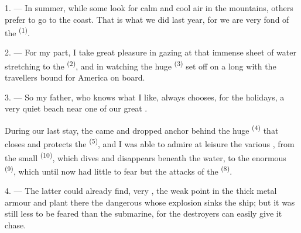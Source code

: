 %

\VUsaut{4.0mm}
\VUsaut{3.0mm}
\VUsaut{3.0mm}

1. --- In summer, while some look for calm and cool air in the mountains,
others prefer to go to the coast. That is what we did last year, for we
are very fond of the  \textsuperscript{(1)}.

2. --- For my part, I take great pleasure in gazing at that immense sheet
of water stretching to the  \textsuperscript{(2)}, and in watching
the huge  \textsuperscript{(3)} set off on a long
 with the travellers bound for America on board.

3. --- So my father, who knows what I like, always chooses, for the
holidays, a very quiet beach near one of our great .

During our last stay, the  came and dropped anchor behind
the huge  \textsuperscript{(4)} that closes and protects the
 \textsuperscript{(5)}, and I was able to admire at leisure the
various , from the small  \textsuperscript{(10)},
which dives and disappears beneath the water, to the enormous
 \textsuperscript{(9)}, which until now had little to fear but the
attacks of the  \textsuperscript{(8)}.

\VUsaut{3.0mm}
\VUsaut{3.0mm}

4. --- The latter could already find, very , the weak point
in the thick metal armour and plant there the dangerous
 whose explosion sinks the ship; but it was still less to be
feared than the submarine, for the destroyers can easily give it chase.

